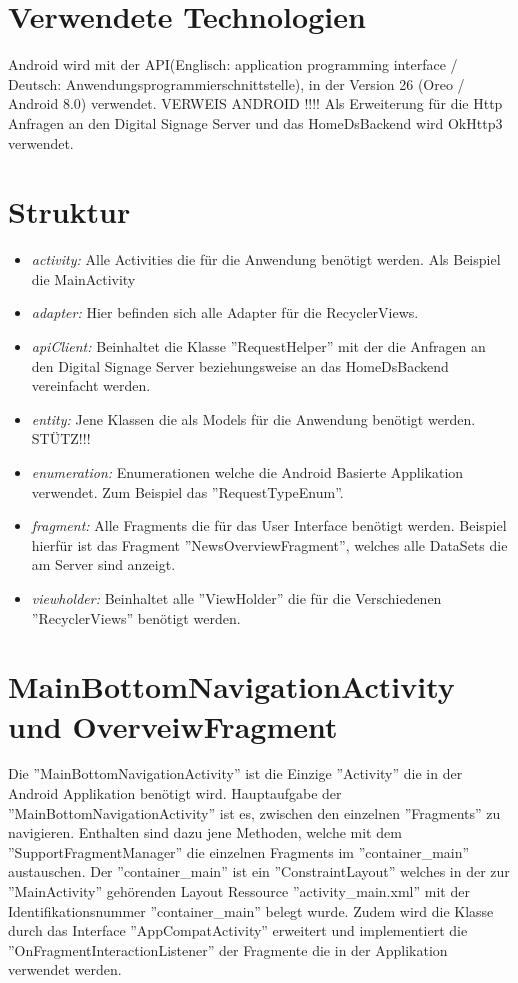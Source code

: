 \section{Verwendete Technologien}
Android wird mit der API(Englisch: application programming interface / Deutsch: Anwendungsprogrammierschnittstelle), in der Version 26 (Oreo / Android 8.0) verwendet. 
VERWEIS ANDROID !!!!
Als Erweiterung für die Http Anfragen an den Digital Signage Server und das HomeDsBackend wird OkHttp3 verwendet.

\section{Struktur}
\begin{itemize}
	\item {\em activity:} Alle Activities die für die Anwendung benötigt werden. Als Beispiel die MainActivity
	
	\item {\em adapter:} Hier befinden sich alle Adapter für die RecyclerViews.
	
	\item {\em apiClient:} Beinhaltet die Klasse ''RequestHelper'' mit der die Anfragen an den Digital Signage Server beziehungsweise an das HomeDsBackend vereinfacht werden.
	
	\item {\em entity:} Jene Klassen die als Models für die Anwendung benötigt werden. 
	STÜTZ!!!
	
	\item {\em enumeration:} Enumerationen welche die Android Basierte Applikation verwendet. Zum Beispiel das ''RequestTypeEnum''.
	
	\item {\em fragment:} Alle Fragments die für das User Interface benötigt werden. Beispiel hierfür ist das Fragment ''NewsOverviewFragment'', welches alle DataSets die am Server sind anzeigt.
	
	\item {\em viewholder:} Beinhaltet alle ''ViewHolder'' die für die Verschiedenen ''RecyclerViews'' benötigt werden. 
	  
		
\end{itemize}

\section{MainBottomNavigationActivity und OverveiwFragment}
Die ''MainBottomNavigationActivity'' ist die Einzige ''Activity'' die in der Android Applikation benötigt wird. Hauptaufgabe der ''MainBottomNavigationActivity'' ist es, zwischen den einzelnen ''Fragments'' zu navigieren. Enthalten sind dazu jene Methoden, welche mit dem ''SupportFragmentManager'' die einzelnen Fragments im ''container\_main'' austauschen. Der ''container\_main'' ist ein ''ConstraintLayout'' welches in der zur ''MainActivity'' gehörenden Layout Ressource ''activity\_main.xml'' mit der Identifikationsnummer ''container\_main'' belegt wurde. Zudem wird die Klasse durch das Interface ''AppCompatActivity'' erweitert und implementiert die ''OnFragmentInteractionListener'' der Fragmente die in der Applikation verwendet werden. 


